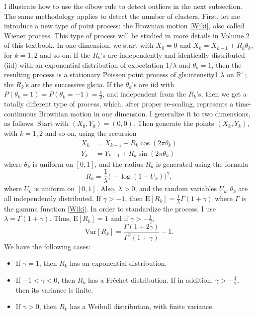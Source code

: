 \documentclass[10pt]{article}
\begin{document}
\noindent I illustrate how to use the elbow rule to detect outliers in the next subsection. The same methodology applies to detect the number of clusters. First, let me introduce a new type of
point process: the
\textcolor{index}{Brownian motion} [\href{https://en.wikipedia.org/wiki/Brownian_motion}{Wiki}], also called
\textcolor{index}{Wiener process}. This type of process will be studied in more details in Volume 2 of this textbook.  In one dimension, we start with $X_0=0$ and $X_k=X_{k-1}+R_k\theta_k$, for $k=1,2$ and so on. If the $R_k$'s are independently and identically distributed (iid) with an exponential distribution of expectation $1/\lambda$ and $\theta_k=1$, then the resulting process is a stationary Poisson point process of
\gls{gls:intensity1} $\lambda$ on $\mathbb{R}^{+}$; the $R_k$'s are the successive
\gls{gls:ia}. If the $\theta_k$'s are iid with $P(\theta_k=1)=P(\theta_k=-1)=\frac{1}{2}$, and independent from the $R_k$'s, then we get a totally different type of process, which, after proper re-scaling, represents a time-continuous Brownian motion in one dimension. I generalize it to two dimensions, as follows. Start with $(X_0,Y_0)=(0,0)$. Then generate the points $(X_k, Y_k)$, with $k=1,2$ and so on, using the recursion
\begin{align}
X_k &  =  X_{k-1}+R_k \cos(2\pi\theta_k) \label{brown10} \\
Y_k & = Y_{k-1}+ R_k\sin(2\pi\theta_k) \label{brown11}
\end{align}
where $\theta_k$ is uniform on $[0, 1]$, and the radius $R_k$ is generated using the formula
\begin{equation}
R_k=\frac{1}{\lambda}\Big(-\log(1-U_k)\Big)^\gamma, \label{gam11}
\end{equation}
where $U_k$ is uniform on $[0,1]$. Also, $\lambda>0$, and the random variables $U_k,\theta_k$ are all independently distributed. If $\gamma>-1$, then
$\mbox{E}[R_k]=\frac{1}{\lambda}\Gamma(1+\gamma)$ where $\Gamma$ is the \textcolor{index}{gamma function}
[\href{https://en.wikipedia.org/wiki/Gamma_function}{Wiki}]. In order to standardize the process, I use
$\lambda=\Gamma(1+\gamma)$. Thus, $\mbox{E}[R_k]=1$ and if $\gamma>-\frac{1}{2}$,
$$\mbox{Var}[R_k]=\frac{\Gamma(1+2\gamma)}{\Gamma^2(1+\gamma)}-1.$$
We have the following cases:
\begin{itemize}
\item If $\gamma=1$, then $R_k$ has an exponential distribution.
\item If $-1<\gamma<0$, then $R_k$ has a \textcolor{index}{Fréchet distribution}. If in addition, $\gamma>-\frac{1}{2}$, then its variance is finite.
\item If $\gamma>0$, then $R_k$ has a \textcolor{index}{Weibull distribution}, with finite variance.
\end{itemize}
\end{document}
